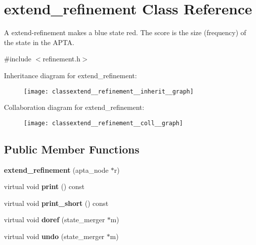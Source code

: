 \hypertarget{classextend__refinement}{}\section{extend\+\_\+refinement Class Reference}
\label{classextend__refinement}


A extend-\/refinement makes a blue state red. The score is the size (frequency) of the state in the A\+P\+TA.  




{\ttfamily \#include $<$refinement.\+h$>$}



Inheritance diagram for extend\+\_\+refinement\+:
\nopagebreak
\begin{figure}[H]
\begin{center}
\leavevmode
\texttt{[image: classextend\_\_refinement\_\_inherit\_\_graph]}
\end{center}
\end{figure}


Collaboration diagram for extend\+\_\+refinement\+:
\nopagebreak
\begin{figure}[H]
\begin{center}
\leavevmode
\texttt{[image: classextend\_\_refinement\_\_coll\_\_graph]}
\end{center}
\end{figure}
\subsection*{Public Member Functions}
\begin{DoxyCompactItemize}
\item 
{\bfseries extend\+\_\+refinement} (apta\+\_\+node $\ast$r)\hypertarget{classextend__refinement_aa00190c7c6717a29a97f35d36e4d3ae7}{}\label{classextend__refinement_aa00190c7c6717a29a97f35d36e4d3ae7}

\item 
virtual void {\bfseries print} () const \hypertarget{classextend__refinement_a2a21165129b353dfa8d3acab801be3da}{}\label{classextend__refinement_a2a21165129b353dfa8d3acab801be3da}

\item 
virtual void {\bfseries print\+\_\+short} () const \hypertarget{classextend__refinement_afefa015267afdfa9080b1f87c12a815f}{}\label{classextend__refinement_afefa015267afdfa9080b1f87c12a815f}

\item 
virtual void {\bfseries doref} (state\+\_\+merger $\ast$m)\hypertarget{classextend__refinement_abb1a3f9c5ee0d5badace72bee46320d4}{}\label{classextend__refinement_abb1a3f9c5ee0d5badace72bee46320d4}

\item 
virtual void {\bfseries undo} (state\+\_\+merger $\ast$m)\hypertarget{classextend__refinement_a5421f88fc0063f78c8ec6887985f7e5e}{}\label{classextend__refinement_a5421f88fc0063f78c8ec6887985f7e5e}

\end{DoxyCompactItemize}
